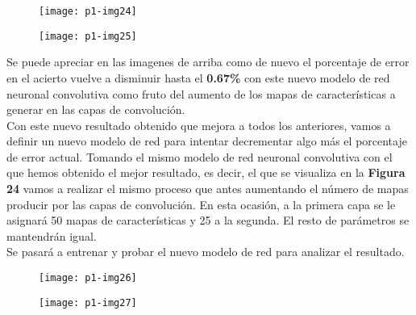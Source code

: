 \documentclass[10pt]{article}
\begin{document}
\begin{figure}[H]
	\begin{center}
 		\texttt{[image: p1-img24]}
	\end{center} 
\end{figure}

\begin{figure}[H]
	\begin{center}
 		\texttt{[image: p1-img25]}
	\end{center} 
\end{figure}

Se puede apreciar en las imagenes de arriba como de nuevo el porcentaje de error en el acierto vuelve a disminuir hasta el \textbf{0.67\%} con este nuevo modelo de red neuronal convolutiva como fruto del aumento de los mapas de características a generar en las capas de convolución. \\

Con este nuevo resultado obtenido que mejora a todos los anteriores, vamos a definir un nuevo modelo de red para intentar decrementar algo más el porcentaje de error actual. Tomando el mismo modelo de red neuronal convolutiva con el que hemos obtenido el mejor resultado, es decir, el que se visualiza en la \textbf{Figura 24} vamos a realizar el mismo proceso que antes aumentando el número de mapas producir por las capas de convolución. En esta ocasión, a la primera capa se le asignará 50 mapas de características y 25 a la segunda. El resto de parámetros se mantendrán igual. \\

Se pasará a entrenar y probar el nuevo modelo de red para analizar el resultado. \\

 \begin{figure}[H]
	\begin{center}
 		\texttt{[image: p1-img26]}
	\end{center} 
\end{figure}

\begin{figure}[H]
	\begin{center}
 		\texttt{[image: p1-img27]}
	\end{center} 
\end{figure}
\end{document}
